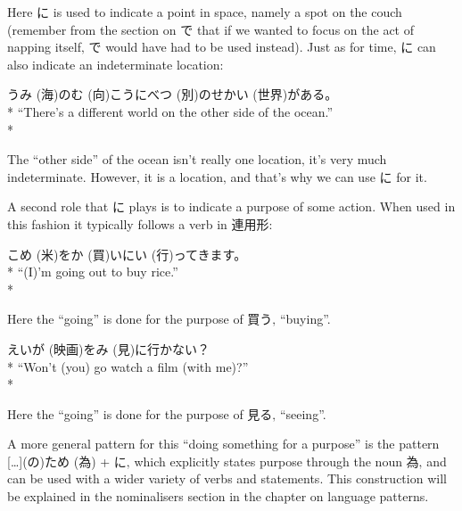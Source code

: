 \documentclass[11pt, b5paper, twoside, openright, onecolumn]{book}
\makeatletter
\newcommand*{\rubystack}[2]{{\relscale{0.5}%
  \begin{tabular}[b]{@{}c@{}}%
    {#1}\\%
   {\textscale{2}{#2}}%
  \end{tabular}}%
}
\DeclareRobustCommand*{\ruby}[2]{%
  \mbox{%
    \setlength{\parskip}{0ex}%
    \BeginAccSupp{method=pdfstringdef,ActualText={#1}}%
      \rubystack{\phantom{#2}}{#1}%
      \llap{%
        \rubystack{#2}{\phantom{#1}}%
      }%
    \EndAccSupp{}%
  }%
}
\renewcommand*{\ruby}[2]{#2 (#1)}%
\newenvironment{exampleblock}{
\setlength{\parindent}{0.6in}
\begin{minipage}[t]{\dimexpr\textwidth-\parindent}}
{\end{minipage}}
\makeatother
\begin{document}
Here に is used to indicate a point in space‚ namely a spot on the couch (remember from the section on で that if we wanted to focus on the act of napping itself‚ で would have had to be used instead). Just as for time‚ に can also indicate an indeterminate location:

\vspace{0.4cm}
\begin{exampleblock}
\ruby{海}{うみ}の\ruby{向}{む}こうに\ruby{別}{べつ}の\ruby{世界}{せかい}がある。 \\* 
“There’s a different world on the other side of the ocean.” \\* 
\end{exampleblock}
\vspace{0.2cm}

The “other side” of the ocean isn’t really one location‚ it’s very much indeterminate. However‚ it is a location‚ and that’s why we can use に for it.

A second role that に plays is to indicate a purpose of some action. When used in this fashion it typically follows a verb in 連用形:

\vspace{0.4cm}
\begin{exampleblock}
\ruby{米}{こめ}を\ruby{買}{か}いに\ruby{行}{い}ってきます。 \\* 
“(I)’m going out to buy rice.” \\* 
\end{exampleblock}
\vspace{0.2cm}

Here the “going” is done for the purpose of 買う‚ “buying”.

\vspace{0.4cm}
\begin{exampleblock}
\ruby{映画}{えいが}を\ruby{見}{み}に行かない？ \\* 
“Won’t (you) go watch a film (with me)?” \\* 
\end{exampleblock}
\vspace{0.2cm}

Here the “going” is done for the purpose of 見る‚ “seeing”.

A  more general pattern for this “doing something for a purpose” is the pattern […](の)\ruby{為}{ため} + に‚ which explicitly states purpose through the noun 為‚ and can be used with a wider variety of verbs and statements. This construction will be explained in the nominalisers section in the chapter on language patterns.
\end{document}
